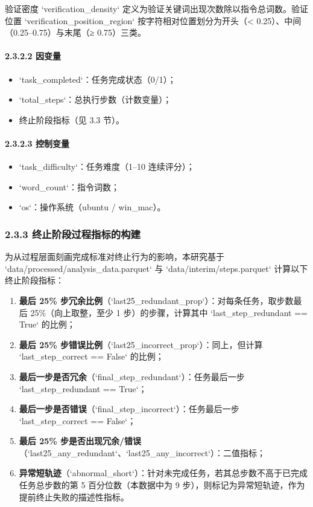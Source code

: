 \documentclass[12pt,a4paper,openany,oneside]{ctexrep}
\begin{document}
验证密度 `verification\_density` 定义为验证关键词出现次数除以指令总词数。验证位置 `verification\_position\_region` 按字符相对位置划分为开头（< 0.25）、中间（0.25–0.75）与末尾（≥ 0.75）三类。

\paragraph{2.3.2.2 因变量}


\begin{itemize}
\item `task\_completed`：任务完成状态（0/1）；
\item `total\_steps`：总执行步数（计数变量）；
\item 终止阶段指标（见 3.3 节）。
\end{itemize}


\paragraph{2.3.2.3 控制变量}


\begin{itemize}
\item `task\_difficulty`：任务难度（1–10 连续评分）；
\item `word\_count`：指令词数；
\item `os`：操作系统（ubuntu / win\_mac）。
\end{itemize}


\subsubsection{2.3.3 终止阶段过程指标的构建}


为从过程层面刻画完成标准对终止行为的影响，本研究基于 `data/processed/analysis\_data.parquet` 与 `data/interim/steps.parquet` 计算以下终止阶段指标：

\begin{enumerate}
\item[1.] \textbf{最后 25\% 步冗余比例}（`last25\_redundant\_prop`）：对每条任务，取步数最后 25\%（向上取整，至少 1 步）的步骤，计算其中 `last\_step\_redundant == True` 的比例；
\item[2.] \textbf{最后 25\% 步错误比例}（`last25\_incorrect\_prop`）：同上，但计算 `last\_step\_correct == False` 的比例；
\item[3.] \textbf{最后一步是否冗余}（`final\_step\_redundant`）：任务最后一步 `last\_step\_redundant == True`；
\item[4.] \textbf{最后一步是否错误}（`final\_step\_incorrect`）：任务最后一步 `last\_step\_correct == False`；
\item[5.] \textbf{最后 25\% 步是否出现冗余/错误}（`last25\_any\_redundant`、`last25\_any\_incorrect`）：二值指标；
\item[6.] \textbf{异常短轨迹}（`abnormal\_short`）：针对未完成任务，若其总步数不高于已完成任务总步数的第 5 百分位数（本数据中为 9 步），则标记为异常短轨迹，作为提前终止失败的描述性指标。
\end{enumerate}
\end{document}
